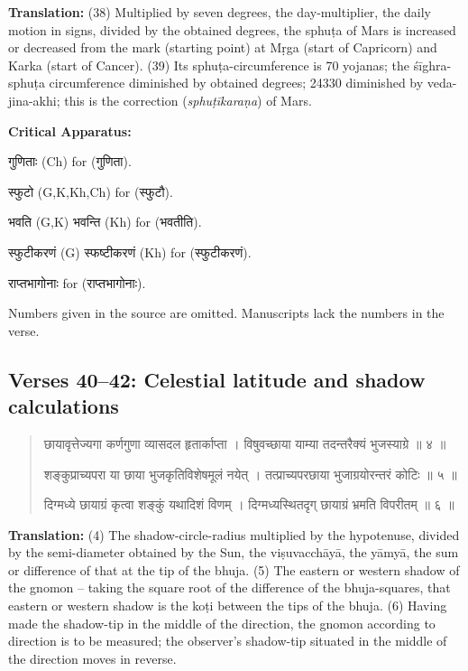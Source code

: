 \documentclass[11pt,a4paper]{article}
\newcommand{\dev}[1]{{\devanagarifont #1}}
\newenvironment{sanskritverse}{%
  \begin{quote}%
  \devanagarifont%
  \setlength{\leftmargin}{2em}%
}{\end{quote}}
\newenvironment{variants}{%
  \small%
  \color{varecolor}%
  \list{}{\leftmargin=2em\itemindent=-1em}%
}{\endlist}
\begin{document}
\textbf{Translation:} (38) Multiplied by seven degrees, the day-multiplier, the daily 
motion in signs, divided by the obtained degrees, the sphuṭa of Mars is increased 
or decreased from the mark (starting point) at Mṛga (start of Capricorn) and Karka 
(start of Cancer). (39) Its sphuṭa-circumference is 70 yojanas; the śīghra-sphuṭa 
circumference diminished by obtained degrees; 24330 diminished by veda-jina-akhi; 
this is the correction (\textit{sphuṭīkaraṇa}) of Mars.

\textcolor{varecolor}{\textbf{Critical Apparatus:}}
\begin{variants}
\item[38.1] \dev{गुणिताः} (Ch) \dev{for} (\dev{गुणिता}).
\item[38.2] \dev{स्फुटो} (G,K,Kh,Ch) \dev{for} (\dev{स्फुटौ}).
\item[38.3] \dev{भवति} (G,K) \dev{भवन्ति} (Kh) \dev{for} (\dev{भवतीति}).
\item[39.1] \dev{स्फुटीकरणं} (G) \dev{स्फष्टीकरणं} (Kh) \dev{for} (\dev{स्फुटीकरणं}).
\item[39.2] \dev{राप्तभागोनाः} \dev{for} (\dev{राप्तभागोनाः}).
\item[\dev{वि०}] Numbers given in the source are omitted. Manuscripts lack the numbers in the verse.
\end{variants}

\subsection*{Verses 40--42: Celestial latitude and shadow calculations}

\begin{sanskritverse}
\dev{छायावृत्तेज्यगा कर्णगुणा व्यासदल हृतार्काप्ता} ।
\dev{विषुवच्छाया याम्या तदन्तरैक्यं भुजस्याग्रे ॥ ४ ॥}

\dev{शङ्कुप्राच्यपरा या छाया भुजकृतिविशेषमूलं नयेत्} ।
\dev{तत्प्राच्यपरछाया भुजाग्रयोरन्तरं कोटिः ॥ ५ ॥}

\dev{दिग्मध्ये छायाग्रं कृत्वा शङ्कुं यथादिशं वि\-णम्} ।
\dev{दिग्मध्यस्थितदृग् छायाग्रं भ्रमति विपरीतम् ॥ ६ ॥}
\end{sanskritverse}

\textbf{Translation:} (4) The shadow-circle-radius multiplied by the hypotenuse, 
divided by the semi-diameter obtained by the Sun, the viṣuvacchāyā, the yāmyā, 
the sum or difference of that at the tip of the bhuja. (5) The eastern or western 
shadow of the gnomon -- taking the square root of the difference of the bhuja-squares, 
that eastern or western shadow is the koṭi between the tips of the bhuja. (6) Having 
made the shadow-tip in the middle of the direction, the gnomon according to direction 
is to be measured; the observer's shadow-tip situated in the middle of the direction 
moves in reverse.
\end{document}

